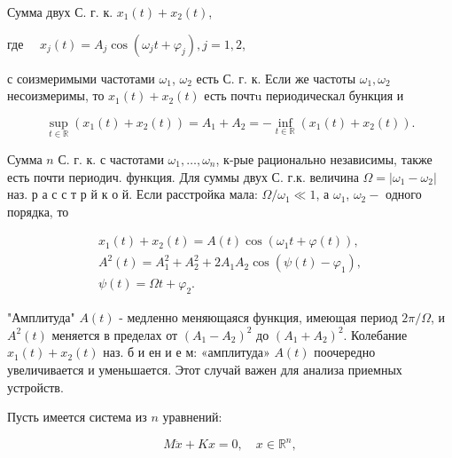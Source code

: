 \documentclass[10pt]{article}
\begin{document}
Сумма двух С. г. к. $x_{1}(t)+x_{2}(t)$,



где $\quad x_{j}(t)=A_{j} \cos \left(\omega_{j} t+\varphi_{j}\right), j=1,2$,



с соизмеримыми частотами $\omega_{1}$, $\omega_{2}$ есть С. г. к. Если же частоты $\omega_{1}, \omega_{2}$ несоизмеримы, то $x_{1}(t)+x_{2}(t)$ есть почтu периодическал бункция и



\[

\sup _{t \in \mathbb{R}}\left(x_{1}(t)+x_{2}(t)\right)=A_{1}+A_{2}=-\inf _{t \in \mathbb{R}}\left(x_{1}(t)+x_{2}(t)\right) .

\]



Сумма $n$ С. г. к. с частотами $\omega_{1}, \ldots, \omega_{n}$, к-рые рационально независимы, также есть почти периодич. функция. Для суммы двух С. г.к. величина $\Omega=\left|\omega_{1}-\omega_{2}\right|$ наз. р а с с т р й к о й. Если расстройка мала: $\Omega / \omega_{1} \ll 1$, а $\omega_{1}$, $\omega_{2}-$ одного порядка, то



\[

\begin{gathered}

x_{1}(t)+x_{2}(t)=A(t) \cos \left(\omega_{1} t+\varphi(t)\right), \\

A^{2}(t)=A_{1}^{2}+A_{2}^{2}+2 A_{1} A_{2} \cos \left(\psi(t)-\varphi_{1}\right), \\

\psi(t)=\Omega t+\varphi_{2} .

\end{gathered}

\]



"Амплитуда" $A(t)$ - медленно меняющаяся функция, имеющая период $2 \pi / \Omega$, и $A^{2}(t)$ меняется в пределах от $\left(A_{1}-A_{2}\right)^{2}$ до $\left(A_{1}+A_{2}\right)^{2}$. Колебание $x_{1}(t)+x_{2}(t)$ наз. б и ен и е м: «амплитуда» $A(t)$ поочередно увеличивается и уменьшается. Этот случай важен для анализа приемных устройств.



Пусть имеется система из $n$ уравнений:



\[

M \ddot{x}+K x=0, \quad x \in \mathbb{R}^{n},

\]
\end{document}
